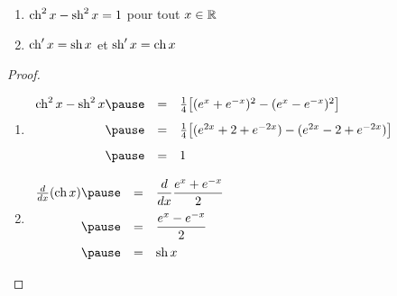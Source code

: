 \begin{frame}

\begin{proposition}
\label{prop:chainette1}
\begin{enumerate}
 \item $\mathop{\text{ch}}\nolimits^2 x - \mathop{\text{sh}}\nolimits^2 x = 1$ \quad  pour tout $x \in \mathbb{R}$
 \pause
 \medskip
 \item $\mathop{\text{ch}}\nolimits ' x = \mathop{\text{sh}}\nolimits x$ \quad et \quad $\mathop{\text{sh}}\nolimits' x = \mathop{\text{ch}}\nolimits x$
\end{enumerate}
\vspace*{1ex}
\end{proposition}

 \pause
 
\begin{proof}
\begin{enumerate}
  \item
 $\begin{array}{rcl}
  \ch^2 x- \sh^2 x 
   \pause&=& \frac14 \big[ (e^x+e^{-x})^2 - (e^x-e^{-x})^2 \big] \\[3mm]
   \pause&=& \frac14 \big[ (e^{2x}+2+e^{-2x}) - (e^{2x}-2+e^{-2x})  \big] \\[3mm]
   \pause&=& 1 \\  
  \end{array}
$
  \pause
  \medskip
  \item  
  $\begin{array}{rcl}
   \frac{d}{dx}(\ch x) 
   \pause&=& \displaystyle \frac{d}{dx} \frac{e^x+e^{-x}}{2} \\[3mm]
   \pause&=& \displaystyle \frac{e^x-e^{-x}}{2} \\[3mm]
   \pause&=& \sh x \\ 
   \end{array}$
\end{enumerate}
\vspace*{-2ex}
  
\end{proof}

\end{frame}


